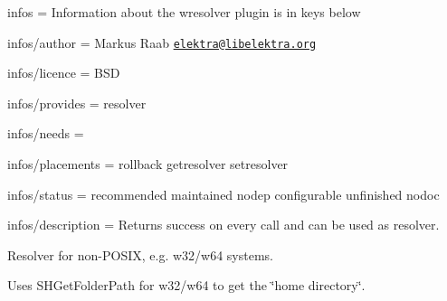 
\begin{DoxyItemize}
\item infos = Information about the wresolver plugin is in keys below
\item infos/author = Markus Raab \href{mailto:elektra@libelektra.org}{\tt elektra@libelektra.\+org}
\item infos/licence = B\+SD
\item infos/provides = resolver
\item infos/needs =
\item infos/placements = rollback getresolver setresolver
\item infos/status = recommended maintained nodep configurable unfinished nodoc
\item infos/description = Returns success on every call and can be used as resolver.
\end{DoxyItemize}

Resolver for non-\/\+P\+O\+S\+IX, e.\+g. w32/w64 systems.

Uses S\+H\+Get\+Folder\+Path for w32/w64 to get the \char`\"{}home directory\char`\"{}. 